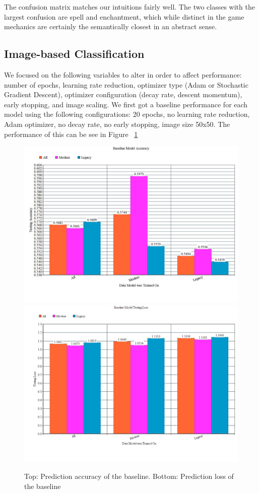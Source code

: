 \documentclass[letterpaper]{article} %
\begin{document}
The confusion matrix matches our intuitions fairly well.
The two classes with the largest confusion are spell and enchantment,
which while distinct in the game mechanics
are certainly the semantically closest in an abstract sense.

\subsection{Image-based Classification}

We focused on the following variables to alter in order to affect performance:
number of epochs, learning rate reduction, optimizer type
(Adam or Stochastic Gradient Descent), optimizer configuration (decay rate,
descent momentum), early stopping, and image scaling.
We first got a baseline performance for each model using the following
configurations: 20 epochs, no learning rate reduction, Adam optimizer,
no decay rate, no early stopping, image size 50x50. The performance of this can
be see in Figure ~\ref{fig:baseline}

\begin{figure}
  \includegraphics[width=.5\textwidth]{baseline-accuracy}
  \includegraphics[width=.5\textwidth]{baseline-loss}
  \caption{Top: Prediction accuracy of the baseline. Bottom: Prediction loss of the baseline}
  \label{fig:baseline}
\end{figure}
\end{document}
